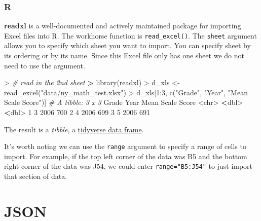\documentclass[
]{book}
\newenvironment{Shaded}{\begin{snugshade}}{\end{snugshade}}
\newcommand{\AttributeTok}[1]{\textcolor[rgb]{0.77,0.63,0.00}{#1}}
\newcommand{\CommentTok}[1]{\textcolor[rgb]{0.56,0.35,0.01}{\textit{#1}}}
\newcommand{\DecValTok}[1]{\textcolor[rgb]{0.00,0.00,0.81}{#1}}
\newcommand{\ErrorTok}[1]{\textcolor[rgb]{0.64,0.00,0.00}{\textbf{#1}}}
\newcommand{\FunctionTok}[1]{\textcolor[rgb]{0.00,0.00,0.00}{#1}}
\newcommand{\NormalTok}[1]{#1}
\newcommand{\OtherTok}[1]{\textcolor[rgb]{0.56,0.35,0.01}{#1}}
\newcommand{\SpecialCharTok}[1]{\textcolor[rgb]{0.00,0.00,0.00}{#1}}
\newcommand{\StringTok}[1]{\textcolor[rgb]{0.31,0.60,0.02}{#1}}
\begin{document}
\hypertarget{r-11}{%
\subsubsection*{R}\label{r-11}}

\textbf{readxl} is a well-documented and actively maintained package for importing Excel files into R. The workhorse function is \texttt{read\_excel()}. The \texttt{sheet} argument allows you to specify which sheet you want to import. You can specify sheet by its ordering or by its name. Since this Excel file only has one sheet we do not need to use the argument.

\begin{Shaded}
\begin{Highlighting}[]
\SpecialCharTok{\textgreater{}} \CommentTok{\# read in the 2nd sheet}
\ErrorTok{\textgreater{}} \FunctionTok{library}\NormalTok{(readxl)}
\SpecialCharTok{\textgreater{}}\NormalTok{ d\_xls }\OtherTok{\textless{}{-}} \FunctionTok{read\_excel}\NormalTok{(}\StringTok{"data/ny\_math\_test.xlsx"}\NormalTok{)}
\SpecialCharTok{\textgreater{}}\NormalTok{ d\_xls[}\DecValTok{1}\SpecialCharTok{:}\DecValTok{3}\NormalTok{, }\FunctionTok{c}\NormalTok{(}\StringTok{"Grade"}\NormalTok{, }\StringTok{"Year"}\NormalTok{, }\StringTok{"Mean Scale Score"}\NormalTok{)]}
\CommentTok{\# A tibble: 3 x 3}
\NormalTok{  Grade  Year }\StringTok{\textasciigrave{}}\AttributeTok{Mean Scale Score}\StringTok{\textasciigrave{}}
  \SpecialCharTok{\textless{}}\NormalTok{chr}\SpecialCharTok{\textgreater{}} \ErrorTok{\textless{}}\NormalTok{dbl}\SpecialCharTok{\textgreater{}}              \ErrorTok{\textless{}}\NormalTok{dbl}\SpecialCharTok{\textgreater{}}
\DecValTok{1} \DecValTok{3}      \DecValTok{2006}                \DecValTok{700}
\DecValTok{2} \DecValTok{4}      \DecValTok{2006}                \DecValTok{699}
\DecValTok{3} \DecValTok{5}      \DecValTok{2006}                \DecValTok{691}
\end{Highlighting}
\end{Shaded}

The result is a \emph{tibble}, a \href{https://tibble.tidyverse.org/}{tidyverse data frame}.

It's worth noting we can use the \texttt{range} argument to specify a range of cells to import. For example, if the top left corner of the data was B5 and the bottom right corner of the data was J54, we could enter \texttt{range="B5:J54"} to just import that section of data.

\hypertarget{json}{%
\section{JSON}\label{json}}
\end{document}
